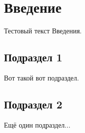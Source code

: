 \section{Введение}
Тестовый текст Введения.
\subsection{Подраздел 1}
Вот такой вот подраздел.
\subsection{Подраздел 2}
Ещё один подраздел...